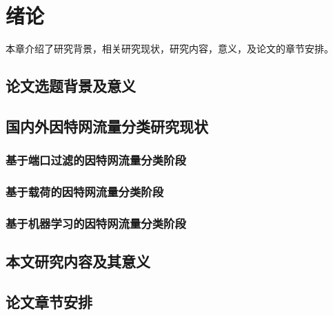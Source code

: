 ﻿\chapter{绪论}
本章介绍了研究背景，相关研究现状，研究内容，意义，及论文的章节安排。\cite{Karagiannis04}
\section{论文选题背景及意义}



\section{国内外因特网流量分类研究现状}


\subsection{基于端口过滤的因特网流量分类阶段}

\subsection{基于载荷的因特网流量分类阶段}

\subsection{基于机器学习的因特网流量分类阶段}



\section{本文研究内容及其意义}



\section{论文章节安排}
